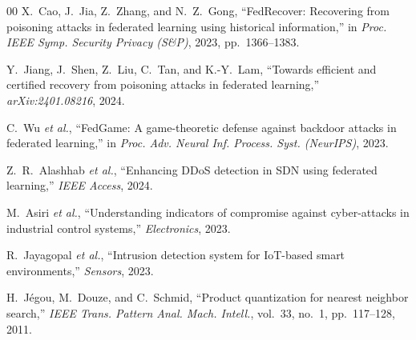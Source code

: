 \documentclass[conference]{IEEEtran}
\begin{document}
\begin{thebibliography}{00}
X.~Cao, J.~Jia, Z.~Zhang, and N.~Z.~Gong,
``FedRecover: Recovering from poisoning attacks in federated learning using historical information,''
in \textit{Proc. IEEE Symp. Security Privacy (S\&P)}, 2023, pp.~1366--1383.

Y.~Jiang, J.~Shen, Z.~Liu, C.~Tan, and K.-Y.~Lam,
``Towards efficient and certified recovery from poisoning attacks in federated learning,''
\textit{arXiv:2401.08216}, 2024.

C.~Wu \textit{et al.},
``FedGame: A game-theoretic defense against backdoor attacks in federated learning,''
in \textit{Proc. Adv. Neural Inf. Process. Syst. (NeurIPS)}, 2023.

Z.~R.~Alashhab \textit{et al.},
``Enhancing DDoS detection in SDN using federated learning,''
\textit{IEEE Access}, 2024.

M.~Asiri \textit{et al.},
``Understanding indicators of compromise against cyber-attacks in industrial control systems,''
\textit{Electronics}, 2023.

R.~Jayagopal \textit{et al.},
``Intrusion detection system for IoT-based smart environments,''
\textit{Sensors}, 2023.

H.~J\'{e}gou, M.~Douze, and C.~Schmid,
``Product quantization for nearest neighbor search,''
\textit{IEEE Trans. Pattern Anal. Mach. Intell.}, vol.~33, no.~1, pp.~117--128, 2011.

\end{thebibliography}
\end{document}
